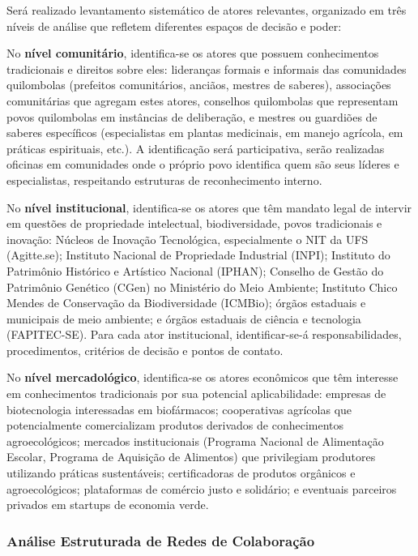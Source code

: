 Será realizado levantamento sistemático de atores relevantes, organizado em três níveis de análise que refletem diferentes espaços de decisão e poder:

No \textbf{nível comunitário}, identifica-se os atores que possuem conhecimentos tradicionais e direitos sobre eles: lideranças formais e informais das comunidades quilombolas (prefeitos comunitários, anciãos, mestres de saberes), associações comunitárias que agregam estes atores, conselhos quilombolas que representam povos quilombolas em instâncias de deliberação, e mestres ou guardiões de saberes específicos (especialistas em plantas medicinais, em manejo agrícola, em práticas espirituais, etc.). A identificação será participativa, serão realizadas oficinas em comunidades onde o próprio povo identifica quem são seus líderes e especialistas, respeitando estruturas de reconhecimento interno.

No \textbf{nível institucional}, identifica-se os atores que têm mandato legal de intervir em questões de propriedade intelectual, biodiversidade, povos tradicionais e inovação: Núcleos de Inovação Tecnológica, especialmente o NIT da UFS (Agitte.se); Instituto Nacional de Propriedade Industrial (INPI); Instituto do Patrimônio Histórico e Artístico Nacional (IPHAN); Conselho de Gestão do Patrimônio Genético (CGen) no Ministério do Meio Ambiente; Instituto Chico Mendes de Conservação da Biodiversidade (ICMBio); órgãos estaduais e municipais de meio ambiente; e órgãos estaduais de ciência e tecnologia (FAPITEC-SE). Para cada ator institucional, identificar-se-á responsabilidades, procedimentos, critérios de decisão e pontos de contato.

No \textbf{nível mercadológico}, identifica-se os atores econômicos que têm interesse em conhecimentos tradicionais por sua potencial aplicabilidade: empresas de biotecnologia interessadas em biofármacos; cooperativas agrícolas que potencialmente comercializam produtos derivados de conhecimentos agroecológicos; mercados institucionais (Programa Nacional de Alimentação Escolar, Programa de Aquisição de Alimentos) que privilegiam produtores utilizando práticas sustentáveis; certificadoras de produtos orgânicos e agroecológicos; plataformas de comércio justo e solidário; e eventuais parceiros privados em startups de economia verde.

\subsubsection{Análise Estruturada de Redes de Colaboração}

